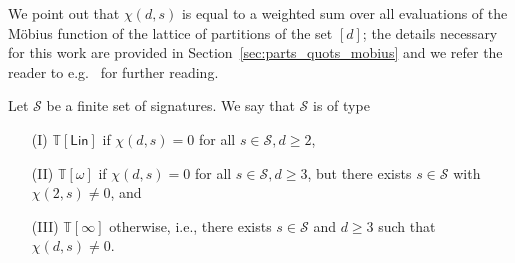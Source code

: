 \documentclass[authorcolumns,numberwithinsect]{no-lipics-v2022}
\begin{document}
We point out that $\chi(d,s)$ is equal to a weighted sum over all evaluations of the M\"obius function of the lattice of partitions of the set $[d]$; the details necessary for this work are provided in Section~\ref{sec:parts_quots_mobius} and we refer the reader to e.g.\ \cite[Chapter 3]{Stanley11} for further reading.

\begin{definition}\label{def:sigtype_intro}
    Let $\mathcal{S}$ be a finite set of signatures. We say that $\mathcal{S}$ is of type
    \begin{itemize}
        \item[(I)] $\mathbb{T}[\mathsf{Lin}]$ if $\chi(d,s)=0$ for all $s\in \mathcal{S}, d\geq 2$, 
        \item[(II)] $\mathbb{T}[\omega]$ if $\chi(d,s)=0$ for all $s\in \mathcal{S}, d\geq 3$, but there exists $s\in \mathcal{S}$ with $\chi(2,s)\neq 0$, and
        \item[(III)] $\mathbb{T}[\infty]$ otherwise, i.e., there exists $s\in \mathcal{S}$ and $d\geq 3$ such that $\chi(d,s)\neq 0$.
    \end{itemize}
\end{definition}
\end{document}
